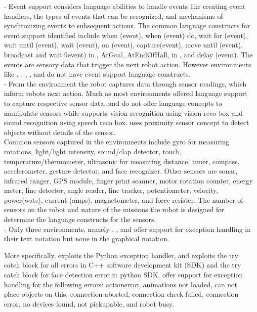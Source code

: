  - Event support considers language abilities to handle events like creating event handlers, the types of events that can be recognized, and mechanisms of synchronizing events to subsequent actions. The common language constructs for event support identified include when (event), when (event) do, wait for (event), wait until (event), wait (event), on (event), capture(event), move until (event), broadcast and wait 9event) in \vex, AtGoal, AtEndOfHall, in \missionlab, and delay (event). The events are sensory data that trigger the next robot action. However environments like \arcbotics, \tivipe, \minibloq, \turtlebot, and \robotc do not have event support language constructs.\\

 - From the environment the robot captures data through sensor readings, which inform robots next action. Much as most environments offered language support to capture respective sensor data, \turtlebot and \missionlab do not offer language concepts to manipulate sensors while \choregraphe supports vision recognition using vision reco box and sound recognition using speech reco box. \ozoblockly uses proximity sensor concept to detect objects without details of the sensor.\\

Common sensors captured in the environments include gyro for measuring rotations, light/light intensity, sound/clap detector, touch, temperature/thermometer, ultrasonic for measuring distance, timer, compass, accelerometer, gesture detector, and face recognizer. Other sensors are sonar, infrared ranger, GPS module, finger print scanner, motor rotation counter, energy meter, line detector, angle reader, line tracker, potentiometer, velocity, power(wats), current (amps), magnetometer, and force resister. The number of sensors on the robot and nature of the missions the robot is designed for determine the language constructs for the sensors.  \\

 - Only three environments, namely \openroberta, \choregraphe, and \codelab offer support for exception handling in their text notation but none in the graphical notation. %

More specifically, \openroberta exploits the Python exception handler, and \choregraphe exploits the try catch block for all errors in C++ software development kit (SDK) and the try catch block for face detection error in python SDK. \codelab offer support for exception handling for the following errors: actionerror, animations not loaded, can not place objects on this, connection aborted, connection check failed, connection error, no devices found, not pickupable, and robot busy.\\

